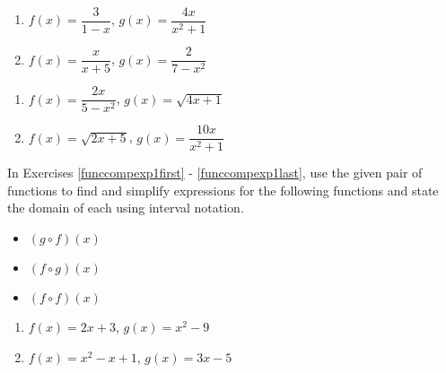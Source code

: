 \begin{multicols}{2}
\begin{enumerate}
\setcounter{enumi}{\value{HW}}

\item  $f(x) = \dfrac{3}{1-x}$, $g(x) = \dfrac{4x}{x^2+1}$
\item  $f(x) = \dfrac{x}{x+5}$, $g(x) = \dfrac{2}{7-x^2}$


\setcounter{HW}{\value{enumi}}
\end{enumerate}
\end{multicols}

\begin{multicols}{2}
\begin{enumerate}
\setcounter{enumi}{\value{HW}}

\item  $f(x) = \dfrac{2x}{5-x^2}$, $g(x) = \sqrt{4x+1}$
\item  $f(x) =\sqrt{2x+5}$, $g(x) = \dfrac{10x}{x^2+1}$ \label{funccompeval1last}

\setcounter{HW}{\value{enumi}}
\end{enumerate}
\end{multicols}

In Exercises \ref{funccompexp1first} - \ref{funccompexp1last}, use the given pair of functions to find and simplify expressions for the following functions and state the domain of each using interval notation.

\begin{multicols}{3}

\begin{itemize}

\item  $(g \circ f)(x)$

\item  $(f \circ g)(x)$

\item  $(f \circ f)(x)$


\end{itemize}

\end{multicols}


\begin{multicols}{2}
\begin{enumerate}
\setcounter{enumi}{\value{HW}}

\item  $f(x) = 2x+3$, $g(x) = x^2-9$ \label{funccompexp1first}
\item  $f(x) = x^2 -x+1$, $g(x) = 3x-5$ 

\setcounter{HW}{\value{enumi}}
\end{enumerate}
\end{multicols}

